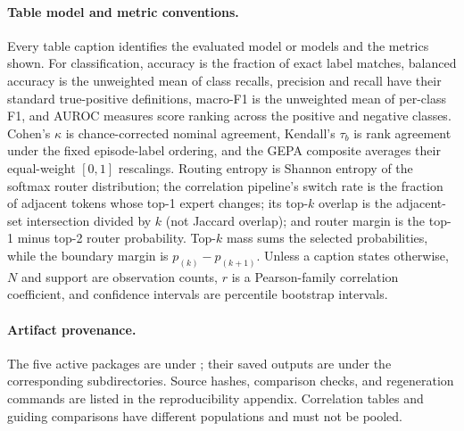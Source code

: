 \paragraph{Table model and metric conventions.}
Every table caption identifies the evaluated model or models and the metrics
shown.  For classification, accuracy is the fraction of exact label matches,
balanced accuracy is the unweighted mean of class recalls, precision and
recall have their standard true-positive definitions, macro-F1 is the
unweighted mean of per-class F1, and AUROC measures score ranking across the
positive and negative classes.  Cohen's $\kappa$ is chance-corrected nominal
agreement, Kendall's $\tau_b$ is rank agreement under the fixed episode-label
ordering, and the GEPA composite averages their equal-weight $[0,1]$
rescalings.  Routing entropy is Shannon entropy of the softmax router
distribution; the correlation pipeline's switch rate is the fraction of
adjacent tokens whose top-1 expert changes; its top-$k$ overlap is the
adjacent-set intersection divided by $k$ (not Jaccard overlap); and router
margin is the top-1 minus top-2 router probability.  Top-$k$ mass sums the
selected probabilities, while the boundary margin is $p_{(k)}-p_{(k+1)}$.
Unless a caption states
otherwise, $N$ and support are observation counts, $r$ is a Pearson-family
correlation coefficient, and confidence intervals are percentile bootstrap
intervals.

\paragraph{Artifact provenance.}
The five active packages are under ; their saved outputs
are under the corresponding  subdirectories. Source hashes,
comparison checks, and regeneration commands are listed in the
reproducibility appendix. Correlation tables and guiding comparisons have
different populations and must not be pooled.
